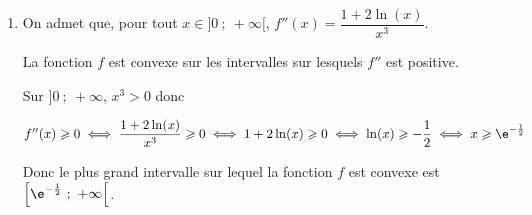 \begin{enumerate}
On dresse le tableau de variations de $f$ sur $]0~;~+\infty[$:

\begin{center}
{\renewcommand{\arraystretch}{1.3}
\def\esp{\hspace*{2.5cm}}
\def\hauteur{0pt}
$\begin{array}{|c|l *4{c}|}
\hline
x & 0  & \esp & \frac{1}{\e} & \esp & +\infty \\ 
\hline
f'(x) &\vline\;\vline  &   \pmb{+} & \vline\hspace{-2.7pt}0 & \pmb{-} & \\ 
\hline
 & \vline\;\vline &  &   \Rnode{max}{\e}  &  &   \\  
f(x) &\vline\;\vline &     &  &  &  \rule{0pt}{\hauteur} \\ 
 & \vline\;\vline \Rnode{min1}{~-\infty} &   &  &  &   \Rnode{min2}{0} \rule{0pt}{\hauteur}    
 \ncline{->}{min1}{max} 
 \ncline{->}{max}{min2} 
 \\ 
\hline
\end{array} $
}
\end{center}	

\item 
On admet que, pour tout $x\in]0~;~+\infty[$, $f''(x)=\dfrac{1+2\ln(x)}{x^3} $.



La fonction $f$ est convexe sur les intervalles sur lesquels $f''$ est positive.

Sur $]0~;~+\infty$, $x^3>0$ donc

$f''(x)\geqslant 0
\iff \dfrac{1+2\ln(x)}{x^3} \geqslant 0
\iff 1+2\ln(x) \geqslant 0
\iff \ln(x) \geqslant -\dfrac{1}{2}
\iff x\geqslant \e^{-\frac{1}{2}}$

Donc le plus grand intervalle sur lequel la fonction $f$ est convexe est $\left [\e^{-\frac{1}{2}}~;~+\infty \right [$.
\end{enumerate}
